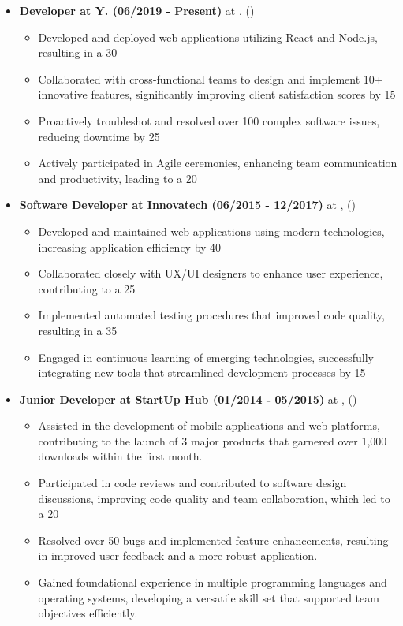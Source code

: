 \documentclass[a4paper,10pt]{article}
\begin{document}
\begin{itemize}[leftmargin=*]
\item \textbf{Developer at Y. (06/2019 - Present)} at \textit{},  ()
\begin{itemize}[noitemsep]
\item Developed and deployed web applications utilizing React and Node.js, resulting in a 30%
\item Collaborated with cross-functional teams to design and implement 10+ innovative features, significantly improving client satisfaction scores by 15%
\item Proactively troubleshot and resolved over 100 complex software issues, reducing downtime by 25%
\item Actively participated in Agile ceremonies, enhancing team communication and productivity, leading to a 20%
\end{itemize}
\item \textbf{Software Developer at Innovatech (06/2015 - 12/2017)} at \textit{},  ()
\begin{itemize}[noitemsep]
\item Developed and maintained web applications using modern technologies, increasing application efficiency by 40%
\item Collaborated closely with UX/UI designers to enhance user experience, contributing to a 25%
\item Implemented automated testing procedures that improved code quality, resulting in a 35%
\item Engaged in continuous learning of emerging technologies, successfully integrating new tools that streamlined development processes by 15%
\end{itemize}
\item \textbf{Junior Developer at StartUp Hub (01/2014 - 05/2015)} at \textit{},  ()
\begin{itemize}[noitemsep]
\item Assisted in the development of mobile applications and web platforms, contributing to the launch of 3 major products that garnered over 1,000 downloads within the first month.
\item Participated in code reviews and contributed to software design discussions, improving code quality and team collaboration, which led to a 20%
\item Resolved over 50 bugs and implemented feature enhancements, resulting in improved user feedback and a more robust application.
\item Gained foundational experience in multiple programming languages and operating systems, developing a versatile skill set that supported team objectives efficiently.
\end{itemize}
\end{itemize}
\end{document}
